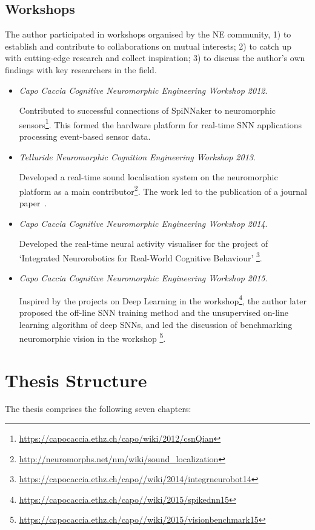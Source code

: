 \subsection{Workshops}
The author participated in workshops organised by the NE community, 1) to establish and contribute to collaborations on mutual interests; 2) to catch up with cutting-edge research and collect inspiration; 3) to discuss the author's own findings with key researchers in the field.
\begin{itemize}
	\item 
	\textit{Capo Caccia Cognitive Neuromorphic Engineering Workshop 2012}.
	
	Contributed to successful connections of SpiNNaker to neuromorphic sensors\footnote{\url{https://capocaccia.ethz.ch/capo/wiki/2012/csnQian}}. 
	This formed the hardware platform for real-time SNN applications processing event-based sensor data.
	
	\item 
	\textit{Telluride Neuromorphic Cognition Engineering Workshop 2013}.
	
	Developed a real-time sound localisation system on the neuromorphic platform as a main contributor\footnote{\url{http://neuromorphs.net/nm/wiki/sound_localization}}.
	The work led to the publication of a journal paper~\citep{lagorce2015breaking}.
	
	
	\item 
	\textit{Capo Caccia Cognitive Neuromorphic Engineering Workshop 2014}.
	
	Developed the real-time neural activity visualiser for the project of `Integrated Neurorobotics for Real-World Cognitive Behaviour' \footnote{\url{https://capocaccia.ethz.ch/capo//wiki/2014/integrneurobot14}}. 
	
	\item 
	\textit{Capo Caccia Cognitive Neuromorphic Engineering Workshop 2015}.
	
	Inspired by the projects on Deep Learning in the workshop\footnote{\url{https://capocaccia.ethz.ch/capo//wiki/2015/spikednn15}}, the author later proposed the off-line SNN training method and the unsupervised on-line learning algorithm of deep SNNs, and led the discussion of benchmarking neuromorphic vision in the workshop \footnote{\url{https://capocaccia.ethz.ch/capo//wiki/2015/visionbenchmark15}}. 	
\end{itemize}
\section{Thesis Structure}
The thesis comprises the following seven chapters:

